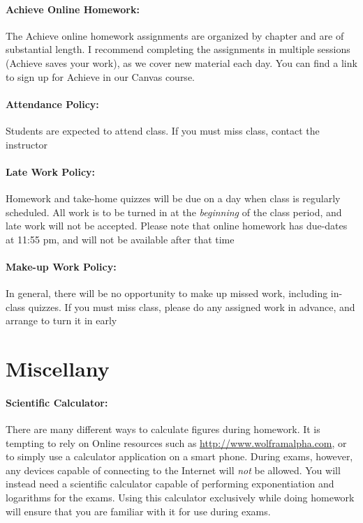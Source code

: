 \documentclass[12pt, letterpaper]{article}
\begin{document}
\paragraph{Achieve Online Homework:}
The Achieve online homework assignments are organized by chapter and are of substantial length. I recommend completing the assignments in multiple sessions (Achieve saves your work), as we cover new material each day. You can find a link to sign up for Achieve in our Canvas course.

\paragraph{Attendance Policy:}
Students are expected to attend class. If you must miss class, contact the instructor

\paragraph{Late Work Policy:}
Homework and take-home quizzes will be due on a day when class is regularly scheduled. All work is to be turned in at the \emph{beginning} of the class period, and late work will not be accepted. Please note that online homework has due-dates at 11:55 pm, and will not be available after that time

\paragraph{Make-up Work Policy:}
In general, there will be no opportunity to make up missed work, including in-class quizzes. If you must miss class, please do any assigned work in advance, and arrange to turn it in early

\section*{Miscellany}

\paragraph{Scientific Calculator:}
There are many different ways to calculate figures during homework. It is tempting to rely on Online resources such as \href{http://www.wolframalpha.com}{http://www.wolframalpha.com}, or to simply use a calculator application on a smart phone. During exams, however, any devices capable of connecting to the Internet will \emph{not} be allowed. You will instead need a scientific calculator capable of performing exponentiation and logarithms for the exams. Using this calculator exclusively while doing homework will ensure that you are familiar with it for use during exams.
\end{document}

